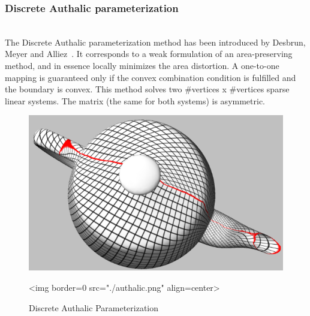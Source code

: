 \subsubsection{Discrete Authalic parameterization}

  \\

The Discrete Authalic parameterization method has been introduced by
Desbrun, Meyer and Alliez~\cite{cgal:dma-ipsm-02}.  It corresponds to
a weak formulation of an area-preserving method, and in essence
locally minimizes the area distortion. A one-to-one mapping is
guaranteed only if the convex combination condition is fulfilled and
the boundary is convex.  This method solves two
\#vertices x \#vertices sparse linear systems. The matrix (the same
for both systems) is asymmetric.

\begin{figure}[bht]
    \begin{center}
        \begin{ccTexOnly}
            \includegraphics{Parameterization/authalic} %
        \end{ccTexOnly}
        \begin{ccHtmlOnly}
            <img border=0 src="./authalic.png" align=center>
        \end{ccHtmlOnly}
        \label{parameterization-fig-authalic}

        \caption{Discrete Authalic Parameterization}
    \end{center}
\end{figure}


